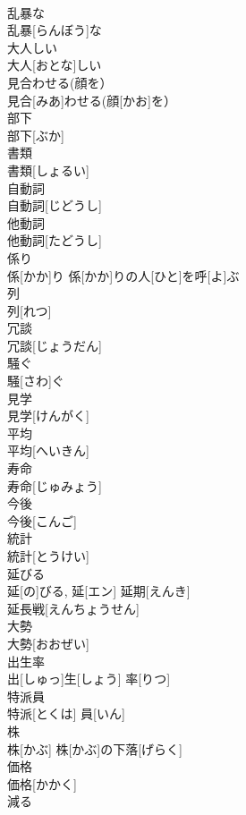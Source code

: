 \documentclass[8pt]{extreport}
\begin{document}
\begin{CJK}{UTF8}{min}
\\	乱暴な	
\\	乱暴[らんぼう]な	
\\	大人しい	
\\	大人[おとな]しい	
\\	見合わせる(顔を）	
\\	見合[みあ]わせる(顔[かお]を）	
\\	部下	
\\	部下[ぶか]	
\\	書類	
\\	書類[しょるい]	
\\	自動詞	
\\	自動詞[じどうし]	
\\	他動詞	
\\	他動詞[たどうし]	
\\	係り	
\\	係[かか]り	係[かか]りの人[ひと]を呼[よ]ぶ　
\\	列	
\\	列[れつ]	
\\	冗談	
\\	冗談[じょうだん]	
\\	騒ぐ	
\\	騒[さわ]ぐ	
\\	見学	
\\	見学[けんがく]	
\\	平均	
\\	平均[へいきん]	
\\	寿命	
\\	寿命[じゅみょう]	
\\	今後	
\\	今後[こんご]	
\\	統計	
\\	統計[とうけい]	
\\	延びる	
\\	延[の]びる, 延[エン]	延期[えんき] 
\\	延長戦[えんちょうせん] 
\\	大勢	
\\	大勢[おおぜい]	
\\	出生率	
\\	出[しゅっ]生[しょう] 率[りつ]	
\\	特派員	
\\	特派[とくは] 員[いん]	
\\	株	
\\	株[かぶ]	株[かぶ]の下落[げらく] 
\\	価格	
\\	価格[かかく]	
\\	減る	

\end{CJK}
\end{document}
